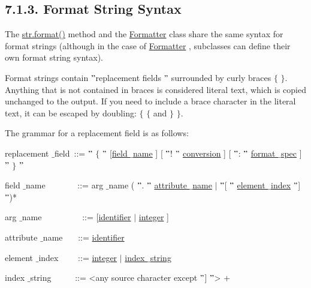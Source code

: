 \documentclass[a4paper,12pt]{report}
\begin{document}
\subsection*{7.1.3. Format String Syntax}
 \par
\noindent 
The \href{https://docs.python.org/2/library/stdtypes.html}{str.format()}
 method and the \href{https://docs.python.org/2/library/string.html}{Formatter}
 class share the same syntax for format strings (although in the case of \href{https://docs.python.org/2/library/string.html}{Formatter}
, subclasses can define their own format string syntax). \par
\noindent 
Format strings contain  $ " $replacement fields $ " $ surrounded by curly braces  $  \{  $ $  \}  $. Anything that is not contained in braces is considered literal text, which is copied unchanged to the output. If you need to include a brace character in the literal text, it can be escaped by doubling:  $  \{  $ $  \{  $ and  $  \}  $ $  \}  $. \par
\noindent 
The grammar for a replacement field is as follows: \par
\noindent 
replacement $  \_  $field~::=   $ " $ $  \{  $ $ " $ [\href{https://docs.python.org/2/library/string.html}{field $  \_  $name}
] [ $ " $! $ " $ \href{https://docs.python.org/2/library/string.html}{conversion}
] [ $ " $: $ " $ \href{https://docs.python.org/2/library/string.html}{format $  \_  $spec}
]  $ " $ $  \}  $ $ " $ \par
\noindent 
field $  \_  $name~~~~~~ ~::=  arg $  \_  $name ( $ " $. $ " $ \href{https://docs.python.org/2/library/string.html}{attribute $  \_  $name}
  $  \vert  $  $ " $[ $ " $ \href{https://docs.python.org/2/library/string.html}{element $  \_  $index}
  $ " $] $ " $)* \par
\noindent 
arg $  \_  $name~~~~~~~~ ~::=  [\href{https://docs.python.org/2/reference/lexical $  \_  $analysis.html}{identifier}
  $  \vert  $ \href{https://docs.python.org/2/reference/lexical $  \_  $analysis.html}{integer}
] \par
\noindent 
attribute $  \_  $name~~ ~::=  \href{https://docs.python.org/2/reference/lexical $  \_  $analysis.html}{identifier}
 \par
\noindent 
element $  \_  $index~~~ ~::=  \href{https://docs.python.org/2/reference/lexical $  \_  $analysis.html}{integer}
  $  \vert  $ \href{https://docs.python.org/2/library/string.html}{index $  \_  $string}
 \par
\noindent 
index $  \_  $string~~~~ ~::=  <any source character except  $ " $] $ " $> + \par
\end{document}
